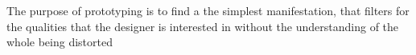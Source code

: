 \begin{principle} \label{prin:fundamental_prototyping_principle} 
  The purpose of prototyping is to find a the simplest manifestation, that filters for the qualities that the designer is interested in without the understanding of the whole being distorted \cite[p. 7:4]{lim}
\end{principle}